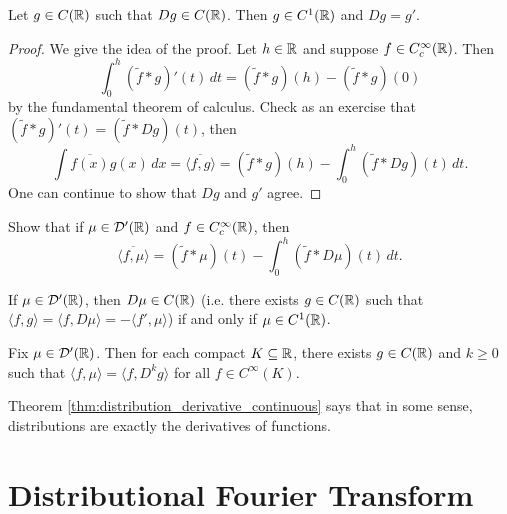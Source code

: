 \begin{lemma}
  Let $g \in C(\mathbb{R})$ such that
  $Dg \in C(\mathbb{R})$. Then
  $g \in C^1(\mathbb{R})$ and
  $Dg = g'$.
\end{lemma}

\begin{proof}
  We give the idea of the proof. Let
  $h \in \mathbb{R}$ and suppose
  $f \in C^\infty_c(\mathbb{R})$. Then
  \[
    \int_0^h (\widetilde{f} * g)'(t)\, dt
    = (\widetilde{f} * g)(h)
    - (\widetilde{f} * g)(0)
  \]
  by the fundamental theorem of calculus.
  Check as an exercise that
  $(\widetilde{f} * g)'(t) = (\widetilde{f} * Dg)(t)$, then
  \[
    \int \overline{f(x)} g(x)\, dx
    = \overline{\langle f, g \rangle}
    = (\widetilde{f} * g)(h)
    - \int_0^h (\widetilde{f} * Dg)(t)\, dt.
  \]
  One can continue to show that
  $Dg$ and $g'$ agree.
\end{proof}

\pagebreak

\begin{exercise}
  Show that if
  $\mu \in \mathcal{D}'(\mathbb{R})$ and
  $f \in C^\infty_c(\mathbb{R})$, then
  \[
    \overline{\langle f, \mu \rangle}
    = (\widetilde{f} * \mu)(t)
    - \int_0^h (\widetilde{f} * D\mu)(t)\, dt.
  \]
\end{exercise}

\begin{theorem}
  If $\mu \in \mathcal{D}'(\mathbb{R})$, then
  $D\mu \in C(\mathbb{R})$ (i.e. there exists
  $g \in C(\mathbb{R})$ such that
  $\langle f, g \rangle = \langle f, D\mu \rangle = -\langle f', \mu \rangle$)
  if and only if $\mu \in C^1(\mathbb{R})$.
\end{theorem}

\begin{theorem}\label{thm:distribution_derivative_continuous}
  Fix $\mu \in \mathcal{D}'(\mathbb{R})$. Then
  for each compact $K \subseteq \mathbb{R}$,
  there exists $g \in C(\mathbb{R})$ and
  $k \ge 0$ such that
  $\langle f, \mu \rangle = \langle f, D^k g \rangle$
  for all $f \in C^\infty(K)$.
\end{theorem}

\begin{remark}
  Theorem \ref{thm:distribution_derivative_continuous}
  says that in some sense,
  distributions are exactly
  the derivatives of functions.
\end{remark}

\section{Distributional Fourier Transform}

